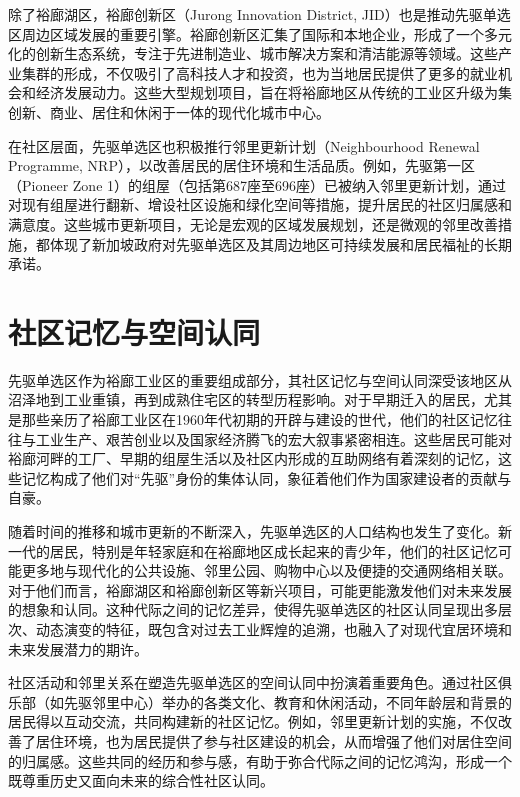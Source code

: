 \documentclass[11pt,a4paper,twoside,openany]{book}
\begin{document}
除了裕廊湖区，裕廊创新区（Jurong Innovation District, JID）也是推动先驱单选区周边区域发展的重要引擎。裕廊创新区汇集了国际和本地企业，形成了一个多元化的创新生态系统，专注于先进制造业、城市解决方案和清洁能源等领域。这些产业集群的形成，不仅吸引了高科技人才和投资，也为当地居民提供了更多的就业机会和经济发展动力。这些大型规划项目，旨在将裕廊地区从传统的工业区升级为集创新、商业、居住和休闲于一体的现代化城市中心。

在社区层面，先驱单选区也积极推行邻里更新计划（Neighbourhood Renewal Programme, NRP），以改善居民的居住环境和生活品质。例如，先驱第一区（Pioneer Zone 1）的组屋（包括第687座至696座）已被纳入邻里更新计划，通过对现有组屋进行翻新、增设社区设施和绿化空间等措施，提升居民的社区归属感和满意度。这些城市更新项目，无论是宏观的区域发展规划，还是微观的邻里改善措施，都体现了新加坡政府对先驱单选区及其周边地区可持续发展和居民福祉的长期承诺。

\section{社区记忆与空间认同}
先驱单选区作为裕廊工业区的重要组成部分，其社区记忆与空间认同深受该地区从沼泽地到工业重镇，再到成熟住宅区的转型历程影响。对于早期迁入的居民，尤其是那些亲历了裕廊工业区在1960年代初期的开辟与建设的世代，他们的社区记忆往往与工业生产、艰苦创业以及国家经济腾飞的宏大叙事紧密相连。这些居民可能对裕廊河畔的工厂、早期的组屋生活以及社区内形成的互助网络有着深刻的记忆，这些记忆构成了他们对“先驱”身份的集体认同，象征着他们作为国家建设者的贡献与自豪。

随着时间的推移和城市更新的不断深入，先驱单选区的人口结构也发生了变化。新一代的居民，特别是年轻家庭和在裕廊地区成长起来的青少年，他们的社区记忆可能更多地与现代化的公共设施、邻里公园、购物中心以及便捷的交通网络相关联。对于他们而言，裕廊湖区和裕廊创新区等新兴项目，可能更能激发他们对未来发展的想象和认同。这种代际之间的记忆差异，使得先驱单选区的社区认同呈现出多层次、动态演变的特征，既包含对过去工业辉煌的追溯，也融入了对现代宜居环境和未来发展潜力的期许。

社区活动和邻里关系在塑造先驱单选区的空间认同中扮演着重要角色。通过社区俱乐部（如先驱邻里中心）举办的各类文化、教育和休闲活动，不同年龄层和背景的居民得以互动交流，共同构建新的社区记忆。例如，邻里更新计划的实施，不仅改善了居住环境，也为居民提供了参与社区建设的机会，从而增强了他们对居住空间的归属感。这些共同的经历和参与感，有助于弥合代际之间的记忆鸿沟，形成一个既尊重历史又面向未来的综合性社区认同。
\end{document}
